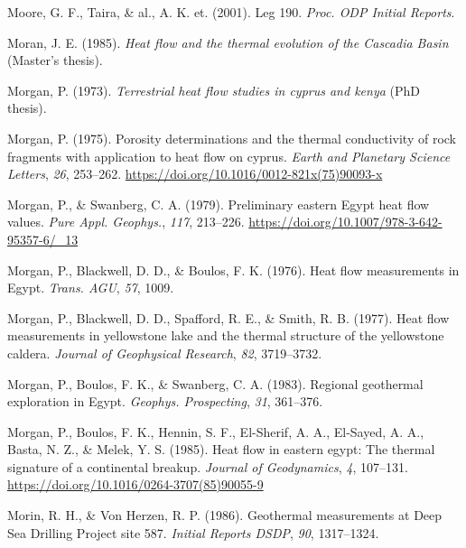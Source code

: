 \begin{CSLReferences}{1}{1}
\leavevmode{}%
Moore, G. F., Taira, \& al., A. K. et. (2001). Leg 190. \emph{Proc. ODP Initial Reports}.

\leavevmode{}%
Moran, J. E. (1985). \emph{Heat flow and the thermal evolution of the {Cascadia Basin}} (Master's thesis).

\leavevmode{}%
Morgan, P. (1973). \emph{Terrestrial heat flow studies in cyprus and kenya} (PhD thesis).

\leavevmode{}%
Morgan, P. (1975). Porosity determinations and the thermal conductivity of rock fragments with application to heat flow on cyprus. \emph{Earth and Planetary Science Letters}, \emph{26}, 253--262. \url{https://doi.org/10.1016/0012-821x(75)90093-x}

\leavevmode{}%
Morgan, P., \& Swanberg, C. A. (1979). Preliminary eastern {Egypt} heat flow values. \emph{Pure Appl. Geophys.}, \emph{117}, 213--226. \url{https://doi.org/10.1007/978-3-642-95357-6/_13}

\leavevmode{}%
Morgan, P., Blackwell, D. D., \& Boulos, F. K. (1976). Heat flow measurements in {Egypt}. \emph{Trans. AGU}, \emph{57}, 1009.

\leavevmode{}%
Morgan, P., Blackwell, D. D., Spafford, R. E., \& Smith, R. B. (1977). Heat flow measurements in yellowstone lake and the thermal structure of the yellowstone caldera. \emph{Journal of Geophysical Research}, \emph{82}, 3719--3732.

\leavevmode{}%
Morgan, P., Boulos, F. K., \& Swanberg, C. A. (1983). Regional geothermal exploration in {Egypt}. \emph{Geophys. Prospecting}, \emph{31}, 361--376.

\leavevmode{}%
Morgan, P., Boulos, F. K., Hennin, S. F., El-Sherif, A. A., El-Sayed, A. A., Basta, N. Z., \& Melek, Y. S. (1985). Heat flow in eastern egypt: The thermal signature of a continental breakup. \emph{Journal of Geodynamics}, \emph{4}, 107--131. \url{https://doi.org/10.1016/0264-3707(85)90055-9}

\leavevmode{}%
Morin, R. H., \& Von Herzen, R. P. (1986). Geothermal measurements at {Deep Sea Drilling Project} site 587. \emph{Initial Reports DSDP}, \emph{90}, 1317--1324.


\end{CSLReferences}
